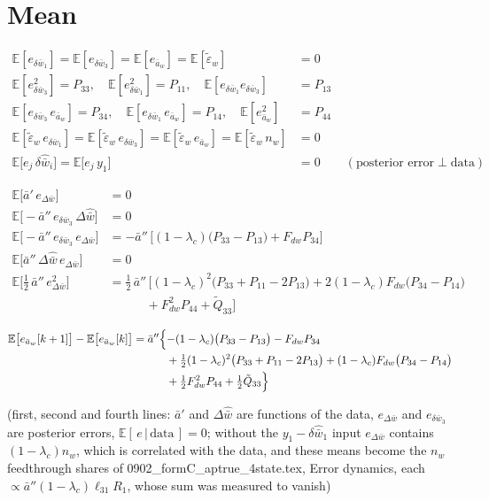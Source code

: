 \documentclass[11pt,a4paper,fontset=none]{ctexart}
\newcommand{\ba}{\bar{a}}
\newcommand{\bw}{\bar{w}}
\newcommand{\E}{\mathbb{E}}
\newcommand{\dWh}{\Delta\hat{\bw}}
\newcommand{\eD}{e_{\Delta\bw}}
\newcommand{\ap}{\ba'}
\newcommand{\app}{\ba''}
\newcommand{\et}{\tilde{\varepsilon}_w}
\begin{document}
\section{Mean}

\begin{align*}
\E[e_{\delta\bw_1}] = \E[e_{\delta\bw_3}] = \E[e_{\ba_w}] = \E[\et] &= 0 \\
\E[e_{\delta\bw_3}^{2}] = P_{33},\quad \E[e_{\delta\bw_1}^{2}] = P_{11},\quad \E[e_{\delta\bw_1}e_{\delta\bw_3}] &= P_{13} \\
\E[e_{\delta\bw_3}\,e_{\ba_w}] = P_{34},\quad \E[e_{\delta\bw_1}\,e_{\ba_w}] = P_{14},\quad \E[e_{\ba_w}^{2}] &= P_{44} \\
\E[\et\,e_{\delta\bw_1}] = \E[\et\,e_{\delta\bw_3}] = \E[\et\,e_{\ba_w}] = \E[\et\,n_w] &= 0 \\
\E\bigl[e_j\,\delta\hat{\bw}_i\bigr] = \E\bigl[e_j\,y_1\bigr] &= 0 \qquad (\text{posterior error} \perp \text{data})
\end{align*}

\begin{align*}
\E\bigl[\ap\,\eD\bigr]                     &= 0 \\
\E\bigl[-\app\,e_{\delta\bw_3}\,\dWh\bigr]  &= 0 \\
\E\bigl[-\app\,e_{\delta\bw_3}\,\eD\bigr]   &= -\app\,\bigl[(1-\lambda_c)\bigl(P_{33} - P_{13}\bigr) + F_{dw}P_{34}\bigr] \\
\E\bigl[\app\,\dWh\,\eD\bigr]               &= 0 \\
\E\bigl[\tfrac{1}{2}\,\app\,\eD^{2}\bigr]   &= \tfrac{1}{2}\,\app\,\bigl[(1-\lambda_c)^{2}\bigl(P_{33} + P_{11} - 2P_{13}\bigr)
   + 2(1-\lambda_c)F_{dw}\bigl(P_{34} - P_{14}\bigr) \\
  &\qquad\quad + F_{dw}^{2}P_{44} + \tilde{Q}_{33}\bigr]
\end{align*}

\begin{align*}
\E\bigl[e_{\ba_w}[k+1]\bigr] - \E\bigl[e_{\ba_w}[k]\bigr]
  &= \app\Bigl\{-(1-\lambda_c)\bigl(P_{33} - P_{13}\bigr) - F_{dw}P_{34} \\
  &\qquad\quad + \tfrac{1}{2}(1-\lambda_c)^{2}\bigl(P_{33} + P_{11} - 2P_{13}\bigr)
     + (1-\lambda_c)F_{dw}\bigl(P_{34} - P_{14}\bigr) \\
  &\qquad\quad + \tfrac{1}{2}F_{dw}^{2}P_{44} + \tfrac{1}{2}\tilde{Q}_{33}\Bigr\}
\end{align*}

(first, second and fourth lines: $\ap$ and $\dWh$ are functions of the data, $\eD$ and $e_{\delta\bw_3}$ are posterior errors,
$\E[\,e\,|\,\text{data}\,] = 0$; without the $y_1 - \delta\hat{\bw}_1$ input $\eD$ contains $(1-\lambda_c)n_w$, which is correlated
with the data, and these means become the $n_w$ feedthrough shares of 0902\_formC\_aptrue\_4state.tex, Error dynamics,
each $\propto \app(1-\lambda_c)\ell_{31}R_1$, whose sum was measured to vanish)
\end{document}
